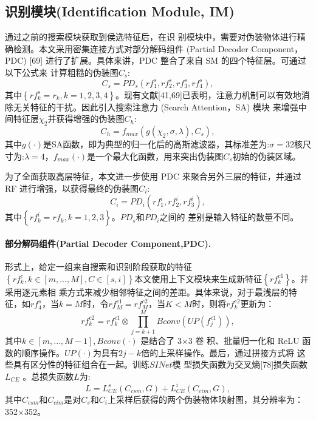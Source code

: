 \documentclass[final]{cvpr}
\newcommand{\mypara}[1]{\paragraph{#1.}}
\begin{document}
\subsection{识别模块(Identification Module, IM)}\label{sec:identification_module}
通过之前的搜索模块获取到侯选特征后，在识 别模块中，需要对伪装物体进行精确检测。本文采用密集连接方式对部分解码组件 (Partial Decoder Component，PDC) [69] 进行了扩展。具体来讲，PDC 整合了来自 SM 的四个特征层。可通过以下公式来 计算粗糙的伪装图$C_{s}$:
\begin{equation}\label{equ:Partial_Decoder_Component}
   C_{s} =PD_{s} \left ( rf_{1}^{s}, rf_{2}^{s}, rf_{3}^{s}, rf_{4}^{s}\right),
\end{equation}
其中$\left\{rf_{k}^{s}=r_{k},k=1,2,3,4\right\}$。现有文献[41,69]已表明，注意力机制可以有效地消除无关特征的干扰。因此引入搜索注意力 (Search Attention，SA) 模块 来增强中间特征层$\chi_{2}$并获得增强的伪装图$C_{h}$:
\begin{equation}\label{equ:Search_Attention}
   C_{h} = f_{max}\left ( g(\chi_{2}, \sigma, \lambda), C_{s} \right ),
\end{equation}
其中$g\left ( \cdot \right ) $是SA函数，即为典型的归一化后的高斯滤波器，其标准差为:$\sigma = 32 $核尺寸为:$ \lambda = 4$，$f_{max}\left ( \cdot \right )$是一个最大化函数，用来突出伪装图$C_{s}$初始的伪装区域。


为了全面获取高层特征，本文进一步使用 PDC 来聚合另外三层的特征，并通过 RF 进行增强，以获得最终的伪装图$C_{i}$:
\begin{equation}\label{equ:RF_Partial_Decoder_Component}
   C_{i} = PD_{i} \left ( rf_{1}^{i}, rf_{2}^{i}, rf_{3}^{i} \right),
\end{equation}
其中$\left \{ rf_{k}^{i} = rf_{k},k=1,2,3 \right \}$。$PD_{s}$和$PD_{i}$之间的
差别是输入特征的数量不同。
\mypara{部分解码组件(Partial Decoder Component,PDC)}
形式上，给定一组来自搜索和识别阶段获取的特征$\left \{ rf_{k}^{c} , k\in \left [ m,...,M \right ]   ,C \in \left [ s,i \right ] \right \} $本文使用上下文模块来生成新特征$\left \{ rf_{k}^{c1} \right \} $。并采用逐元素相
乘方式来减少相邻特征之间的差距。具体来说，对于最浅层的特征，如$rf_{4}^{s}$，当$k=M$时，令$rf_{M}^{c1}=rf_{M}^{c2}$，当$K<M$时，则将$rf_{k}^{c2}$更新为：
\begin{equation}\label{equ:PDC_refresh}
   rf_{k}^{c2} =rf_{k}^{c1} \otimes  {\textstyle \prod_{j=k+1}^{M}}Bconv\left ( UP\left ( f_{j}^{c1}  \right )  \right )  ,
\end{equation}
其中$k\in \left [ m,...,M−1 \right ],Bconv(\cdot) $ 是结合了 3×3 卷 积、批量归一化和 ReLU 函数的顺序操作。$UP(\cdot) $为具有$2j−k$倍的上采样操作。最后，通过拼接方式将 这些具有区分性的特征组合在一起。训练$SINet$模 型损失函数为交叉熵[78]损失函数$L_{CE}$ 。总损失函数$L$为:
\begin{equation}\label{equ:L_CE_loss}
   L=L_{CE}^{s}\left ( C_{csm},G \right )  +L_{CE}^{i} \left ( C_{cim},G \right ) ,
\end{equation}
其中$C_{csm}$和$C_{cim}$是对$C_{s}$和$C_{i}$上采样后获得的两个伪装物体映射图，其分辨率为：352×352。
\end{document}
